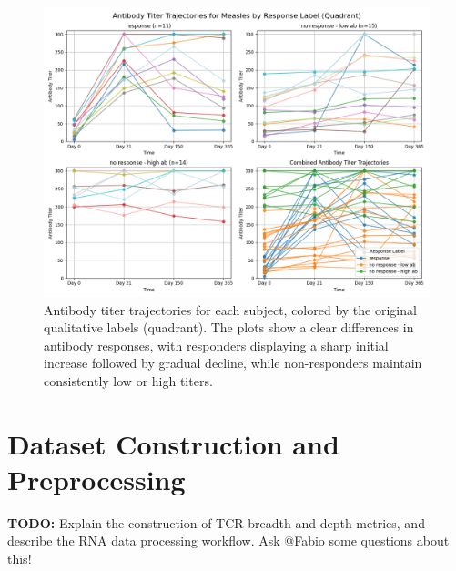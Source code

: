 \documentclass[12pt,a4paper]{report}
\newcommand{\todo}[1]{%
  \par\noindent%
  \begin{tcolorbox}[colback=yellow, colframe=black, boxrule=0.5pt, sharp corners, width=\linewidth, before skip=5pt, after skip=5pt]
    \textbf{TODO:} #1
  \end{tcolorbox}%
  \par
}
\begin{document}
\begin{figure}[H]
\centering
\hspace*{-1cm}
\includegraphics[width=1.1\textwidth]{images/Antibody_Titer_Trajectories_for_Measles_by_Original_Label_(Quadrant).png}
\caption[Antibody Titer Trajectories by Original Label (Quadrant)]{Antibody titer trajectories for each subject, colored by the original qualitative labels (quadrant). The plots show a clear differences in antibody responses, with responders displaying a sharp initial increase followed by gradual decline, while non-responders maintain consistently low or high titers.}
\label{fig:titer_original_label}
\end{figure}

\section{Dataset Construction and Preprocessing}
\todo{Explain the construction of TCR breadth and depth metrics, and describe the RNA data processing workflow. Ask @Fabio some questions about this!}

\pagebreak
\end{document}
